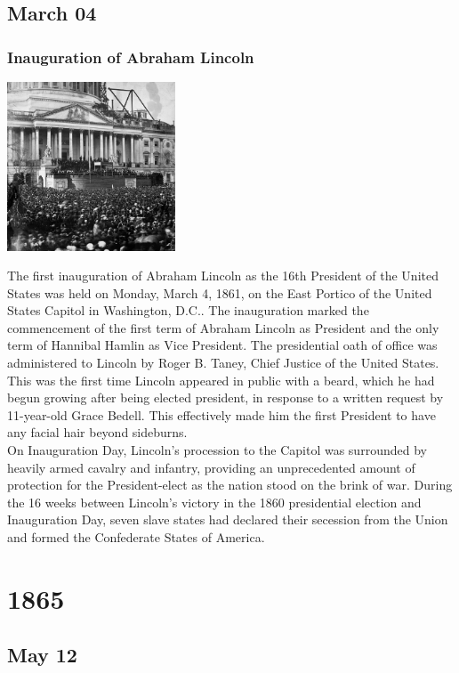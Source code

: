 \documentclass[11pt]{report}
\begin{document}
\section{March 04}
\subsection{Inauguration of Abraham Lincoln}
\vspace{2mm}\begin{center}\includegraphics[width=5cm]{./img/inaugLincoln.jpg}\end{center}
The first inauguration of Abraham Lincoln as the 16th President of the United States was held on Monday, March 4, 1861, on the East Portico of the United States Capitol in Washington, D.C.. The inauguration marked the commencement of the first term of Abraham Lincoln as President and the only term of Hannibal Hamlin as Vice President. The presidential oath of office was administered to Lincoln by Roger B. Taney, Chief Justice of the United States.\\
This was the first time Lincoln appeared in public with a beard, which he had begun growing after being elected president, in response to a written request by 11-year-old Grace Bedell. This effectively made him the first President to have any facial hair beyond sideburns.\\
On Inauguration Day, Lincoln's procession to the Capitol was surrounded by heavily armed cavalry and infantry, providing an unprecedented amount of protection for the President-elect as the nation stood on the brink of war. During the 16 weeks between Lincoln's victory in the 1860 presidential election and Inauguration Day, seven slave states had declared their secession from the Union and formed the Confederate States of America.

\chapter{1865}
\section{May 12}
\end{document}
